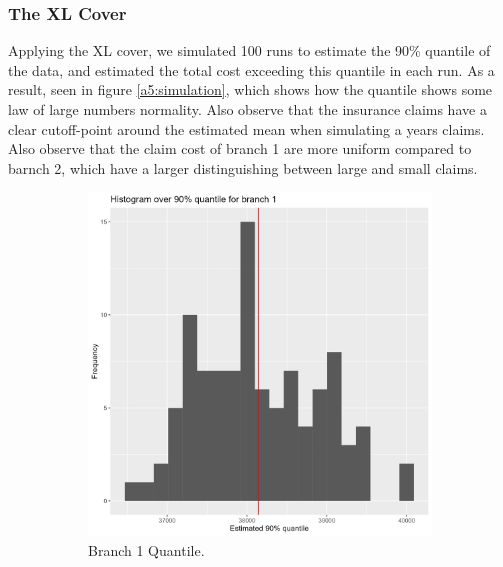 \documentclass[11pt]{article}
\begin{document}
\subsubsection*{The XL Cover}

Applying the XL cover, we simulated 100 runs to estimate the 90\% quantile of the data, and estimated the total cost exceeding this quantile in each run.
As a result, seen in figure \ref{a5:simulation}, which shows how the quantile shows some law of large numbers normality.
Also observe that the insurance claims have a clear cutoff-point around the estimated mean when simulating a years claims.
Also observe that the claim cost of branch 1 are more uniform compared to barnch 2, which have a larger distinguishing between large and small claims.

 \begin{figure}[!h]
\centering
    \begin{subfigure}{.24\textwidth}
      \centering
      \includegraphics[width=.9\linewidth]{plots/reinsurance1/histogram_over_90p_quantile_1.png}
      \caption{Branch 1 Quantile.}
    \end{subfigure}
    \begin{subfigure}{.24\textwidth}
      \centering

\end{subfigure}
\end{figure}
\end{document}
